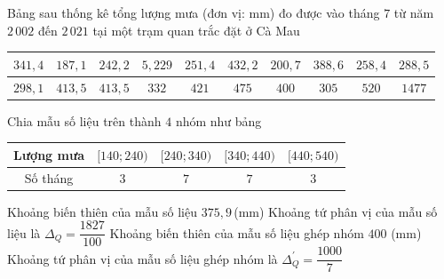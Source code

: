 \begin{ex}%
	Bảng sau thống kê tổng lượng mưa (đơn vị: mm) đo được  vào tháng $7$ từ năm $2\,002$ đến $2\,021$ tại một trạm quan trắc đặt ở Cà Mau
	\begin{center}
		\begin{tabular}{|c|c|c|c|c|c|c|c|c|c|}
			\hline 
			$341{,}4$  & $187{,}1$& $242{,}2$& $5{,22}9$& $251{,}4$& $432{,}2$& $200{,}7$& $388{,}6$& $258{,}4$& $288{,}5$\\
			\hline 
			 $298{,}1$ & $413{,}5$& $413{,}5$& $332$& $421$& $475$& $400$& $305$& $520$& $1477$\\
			\hline 
		\end{tabular}
	\end{center}
	Chia  mẫu số liệu trên thành $4$ nhóm như bảng
	\begin{center}
		\begin{tabular}{|c|c|c|c|c|}
			\hline 
			Lượng mưa & $[140;240)$& $[240;340)$& $[340;440)$& $[440;540)$\\ 
			\hline 
			Số tháng & $3$&  $7$& $7$& $3$\\
			\hline 
		\end{tabular}
	\end{center}
	\choiceTF 
		{\True Khoảng biến  thiên của mẫu số liệu $375,9$\,(mm)}
		{Khoảng tứ phân vị của  mẫu số liệu là $\Delta_Q=\dfrac{1827}{100}$}
		{\True  Khoảng biến thiên của mẫu số liệu ghép nhóm $400$ (mm)}
		{\True  Khoảng tứ phân vị của mẫu số liệu ghép nhóm là $\Delta_Q ^{'}=\dfrac{1000}{7}$}
\end{ex}
